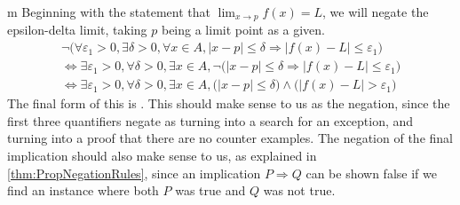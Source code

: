 \documentclass[11pt]{article}
\begin{document}
\begin{my proof}{m}
Beginning with the statement that $\lim_{x \to p}f(x) = L$, we will negate the epsilon-delta limit, taking $p$ being a limit point as a given. \begin{gather*}
\neg \Big( \forall \varepsilon_1 > 0, \exists \delta > 0, \forall x \in A, |x - p| \le \delta \Rightarrow |f(x) - L| \le \varepsilon_1\Big) \\
\Leftrightarrow \exists \varepsilon_1 > 0, \forall \delta > 0, \exists x \in A, \neg \Big(|x - p| \le \delta \Rightarrow |f(x) - L| \le \varepsilon_1\Big) \\
\Leftrightarrow \exists \varepsilon_1 > 0, \forall \delta > 0, \exists x \in A, \big( |x - p| \le \delta \big) \wedge \big( |f(x) - L| > \varepsilon_1 \big)
\end{gather*}
The final form of this is . This should make sense to us as the negation, since the first three quantifiers negate as  turning into a search for an exception, and  turning into a proof that there are no counter examples. The negation of the final implication should also make sense to us, as explained in \ref{thm:PropNegationRules}, since an implication $P \Rightarrow Q$ can be shown false if we find an instance where both $P$ was true and $Q$ was not true.


\end{my proof}
\end{document}
